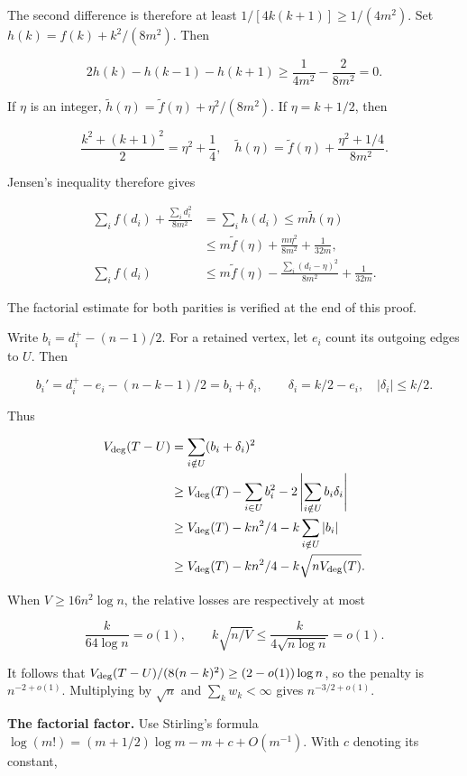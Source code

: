 \documentclass[11pt,a4paper]{article}
\begin{document}
The second difference is therefore at least \(1/[4k(k+1)]\ge1/(4m^2)\). Set \(h(k)=f(k)+k^2/(8m^2)\). Then

\[
2h(k)-h(k-1)-h(k+1)
\ge\frac1{4m^2}-\frac2{8m^2}=0.
\]

If \(\eta\) is an integer, \(\widetilde h(\eta)=\widetilde f(\eta)+\eta^2/(8m^2)\). If \(\eta=k+1/2\), then

\[
\frac{k^2+(k+1)^2}{2}=\eta^2+\frac14,
\quad
\widetilde h(\eta)=\widetilde f(\eta)+\frac{\eta^2+1/4}{8m^2}.
\]

Jensen's inequality therefore gives

\[
\begin{aligned}
\sum_i f(d_i)+\frac{\sum_i d_i^2}{8m^2}
&=\sum_i h(d_i)\le m\widetilde h(\eta)\\
&\le m\widetilde f(\eta)+\frac{m\eta^2}{8m^2}+\frac1{32m},\\
\sum_i f(d_i)&\le m\widetilde f(\eta)
-\frac{\sum_i(d_i-\eta)^2}{8m^2}+\frac1{32m}.
\end{aligned}
\]

The factorial estimate for both parities is verified at the end of this proof.

Write \(b_i=d_i^+-(n-1)/2\). For a retained vertex, let \(e_i\) count its outgoing edges to \(U\). Then

\[
b_i'=d_i^+-e_i-(n-k-1)/2=b_i+\delta_i,
\qquad\delta_i=k/2-e_i,\quad |\delta_i|\le k/2.
\]

Thus

\[
\begin{aligned}
V_{\rm deg}(T-U)&=\sum_{i\notin U}(b_i+\delta_i)^2\\
&\ge V_{\rm deg}(T)-\sum_{i\in U}b_i^2-2\left|\sum_{i\notin U}b_i\delta_i\right|\\
&\ge V_{\rm deg}(T)-kn^2/4-k\sum_{i\notin U}|b_i|\\
&\ge V_{\rm deg}(T)-kn^2/4-k\sqrt{nV_{\rm deg}(T)}.
\end{aligned}
\]

When \(V\ge16n^2\log n\), the relative losses are respectively at most

\[
\frac{k}{64\log n}=o(1),\qquad
k\sqrt{n/V}\le\frac{k}{4\sqrt{n\log n}}=o(1).
\]

It follows that \(V_{\rm deg}(T-U)/(8(n-k)^2)\ge(2-o(1))\log n\), so the penalty is \(n^{-2+o(1)}\). Multiplying by \(\sqrt n\) and \(\sum_kw_k<\infty\) gives \(n^{-3/2+o(1)}\).

\textbf{The factorial factor.} Use Stirling's formula \(\log(m!)=(m+1/2)\log m-m+c+O(m^{-1})\). With \(c\) denoting its constant,
\end{document}
